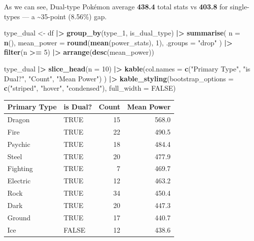 \documentclass[
]{article}
\newenvironment{Shaded}{\begin{snugshade}}{\end{snugshade}}
\newcommand{\AttributeTok}[1]{\textcolor[rgb]{0.13,0.29,0.53}{#1}}
\newcommand{\ConstantTok}[1]{\textcolor[rgb]{0.56,0.35,0.01}{#1}}
\newcommand{\DecValTok}[1]{\textcolor[rgb]{0.00,0.00,0.81}{#1}}
\newcommand{\FunctionTok}[1]{\textcolor[rgb]{0.13,0.29,0.53}{\textbf{#1}}}
\newcommand{\NormalTok}[1]{#1}
\newcommand{\OtherTok}[1]{\textcolor[rgb]{0.56,0.35,0.01}{#1}}
\newcommand{\SpecialCharTok}[1]{\textcolor[rgb]{0.81,0.36,0.00}{\textbf{#1}}}
\newcommand{\StringTok}[1]{\textcolor[rgb]{0.31,0.60,0.02}{#1}}
\begin{document}
As we can see, Dual-type Pokémon average \textbf{438.4} total stats vs
\textbf{403.8} for single-types --- a \textasciitilde35-point (8.56\%)
gap.

\begin{Shaded}
\begin{Highlighting}[]
\NormalTok{type\_dual }\OtherTok{\textless{}{-}}\NormalTok{ df }\SpecialCharTok{|\textgreater{}}
  \FunctionTok{group\_by}\NormalTok{(type\_1, is\_dual\_type) }\SpecialCharTok{|\textgreater{}}
  \FunctionTok{summarise}\NormalTok{(}
    \AttributeTok{n          =} \FunctionTok{n}\NormalTok{(),}
    \AttributeTok{mean\_power =} \FunctionTok{round}\NormalTok{(}\FunctionTok{mean}\NormalTok{(power\_stats), }\DecValTok{1}\NormalTok{),}
    \AttributeTok{.groups    =} \StringTok{"drop"}
\NormalTok{  ) }\SpecialCharTok{|\textgreater{}}
  \FunctionTok{filter}\NormalTok{(n }\SpecialCharTok{\textgreater{}=} \DecValTok{5}\NormalTok{) }\SpecialCharTok{|\textgreater{}}
  \FunctionTok{arrange}\NormalTok{(}\FunctionTok{desc}\NormalTok{(mean\_power))}

\NormalTok{type\_dual }\SpecialCharTok{|\textgreater{}} \FunctionTok{slice\_head}\NormalTok{(}\AttributeTok{n =} \DecValTok{10}\NormalTok{) }\SpecialCharTok{|\textgreater{}}
  \FunctionTok{kable}\NormalTok{(}\AttributeTok{col.names =} \FunctionTok{c}\NormalTok{(}\StringTok{"Primary Type"}\NormalTok{, }\StringTok{"is Dual?"}\NormalTok{, }\StringTok{"Count"}\NormalTok{, }\StringTok{"Mean Power"}\NormalTok{)}
\NormalTok{  ) }\SpecialCharTok{|\textgreater{}}
  \FunctionTok{kable\_styling}\NormalTok{(}\AttributeTok{bootstrap\_options =} \FunctionTok{c}\NormalTok{(}\StringTok{"striped"}\NormalTok{, }\StringTok{"hover"}\NormalTok{, }\StringTok{"condensed"}\NormalTok{),}
                \AttributeTok{full\_width =} \ConstantTok{FALSE}\NormalTok{)}
\end{Highlighting}
\end{Shaded}

\begin{longtable}[t]{llrr}
\toprule
Primary Type & is Dual? & Count & Mean Power\\
\midrule
Dragon & TRUE & 15 & 568.0\\
Fire & TRUE & 22 & 490.5\\
Psychic & TRUE & 18 & 484.4\\
Steel & TRUE & 20 & 477.9\\
Fighting & TRUE & 7 & 469.7\\
\addlinespace
Electric & TRUE & 12 & 463.2\\
Rock & TRUE & 34 & 450.4\\
Dark & TRUE & 20 & 447.3\\
Ground & TRUE & 17 & 440.7\\
Ice & FALSE & 12 & 438.6\\
\bottomrule
\end{longtable}
\end{document}
